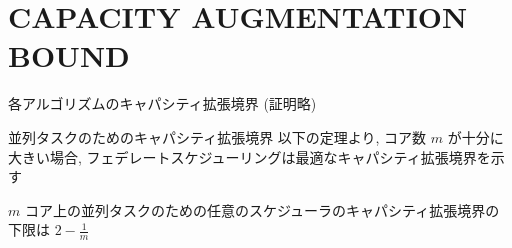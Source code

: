 
\section{CAPACITY AUGMENTATION BOUND}
\label{sec: CAPACITY AUGMENTATION BOUND}

\begin{frame}{各アルゴリズムのキャパシティ拡張境界 (証明略)}
\end{frame}

\begin{frame}[label=theorem1]{並列タスクのためのキャパシティ拡張境界}
    以下の定理より, コア数 $m$ が十分に大きい場合, フェデレートスケジューリングは最適なキャパシティ拡張境界を示す
    \begin{theorem}[]
        $m$ コア上の並列タスクのための任意のスケジューラのキャパシティ拡張境界の下限は $2-\frac{1}{m}$
    \end{theorem}
\end{frame}
